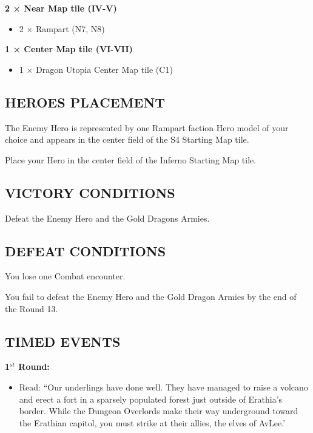 \begin{multicols*}{2}
\textbf{2 × Near Map tile (IV-V)}
\begin{itemize}
  \item 2 × Rampart (N7, N8)
\end{itemize}

\textbf{1 × Center Map tile (VI-VII)}
\begin{itemize}
  \item 1 × Dragon Utopia Center Map tile (C1)
\end{itemize}

\subsection*{\MakeUppercase{Heroes placement}}

The Enemy Hero is represented by one Rampart faction Hero model of your choice
and appears in the center field of the S4 Starting Map tile.

Place your Hero in the center field of the Inferno Starting Map tile.

\subsection*{\MakeUppercase{Victory Conditions}}

Defeat the Enemy Hero and the Gold Dragons Armies.

\subsection*{\MakeUppercase{Defeat Conditions}}

You lose one Combat encounter.

You fail to defeat the Enemy Hero and the Gold Dragon Armies by the end of the Round 13.

\subsection*{\MakeUppercase{Timed Events}}

\textbf{1$^{st}$ Round:}
\begin{itemize}
  \item Read: ``Our underlings have done well. They have managed to raise a volcano
    and erect a fort in a sparsely populated forest just outside of Erathia's border.
    While the Dungeon Overlords make their way underground toward the Erathian capitol,
    you must strike at their allies, the elves of AvLee.'
\end{itemize}


\end{multicols*}
